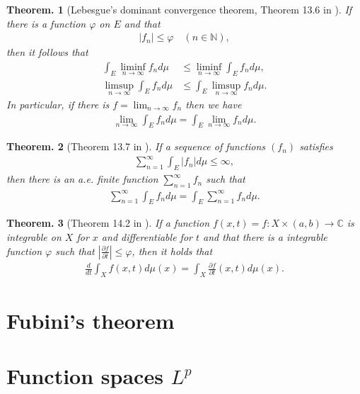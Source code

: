\documentclass[openany, a4paper, oneside]{jsbook}
\theoremstyle{break}
\theoremstyle{breakdefn}
\newtheorem{thm}{Theorem.}[section]
\newcommand{\abs}[1]{\left|#1\right|}
\newcommand{\rbk}[1]{\left (#1\right)}
\newcommand{\bbC}{\mathbb{C}}
\newcommand{\bbN}{\mathbb{N}}
\newcommand{\dmu}{d \mu}
\begin{document}
\begin{thm}[Lebesgue's dominant convergence theorem, Theorem 13.6 in \cite{SeizoIto1}]
 If there is a function $\varphi$ on $E$ and that
 \begin{align}
  \abs{f_n} \leq \varphi \quad \rbk{n \in \bbN},
 \end{align}
 then it follows that
 \begin{align}
  \int_E \liminf_{n \to \infty} f_n \dmu
  &\leq
  \liminf_{n \to \infty} \int_E f_n \dmu, \\
  \limsup_{n \to \infty} \int_E f_n \dmu
  &\leq
  \int_E \limsup_{n \to \infty} f_n \dmu.
 \end{align}
 In particular, if there is $f = \lim_{n \to \infty} f_n$ then we have
 \begin{align}
  \lim_{n \to \infty} \int_E f_n \dmu
  =
  \int_E \lim_{n \to \infty} f_n \dmu.
 \end{align}
\end{thm}
\begin{thm}[Theorem 13.7 in \cite{SeizoIto1}]
 If a sequence of functions $(f_n)$ satisfies
 \begin{align}
  \sum_{n=1}^{\infty} \int_E \abs{f_n} \dmu
  \leq
  \infty,
 \end{align}
 then there is an a.e. finite function $\sum_{n=1}^{\infty} f_n$ such that
 \begin{align}
  \sum_{n=1}^{\infty} \int_E f_n \dmu
  =
  \int_E \sum_{n=1}^{\infty} f_n \dmu.
 \end{align}
\end{thm}
\begin{thm}[Theorem 14.2 in \cite{SeizoIto1}]
 If a function $f (x,t) = f \colon X \times \rbk{a, b} \to \bbC$ is integrable on $X$ for $x$ and differentiable for $t$
 and that there is a integrable function $\varphi$ such that $\abs{\frac{\partial f}{\partial t}} \leq \varphi$,
 then it holds that
 \begin{align}
  \frac{d}{dt} \int_X f (x, t) \dmu (x)
  =
  \int_X \frac{\partial f}{\partial t} (x, t) \dmu (x).
 \end{align}
\end{thm}
\section{Fubini's theorem}

\section{Function spaces $L^p$}
\end{document}
